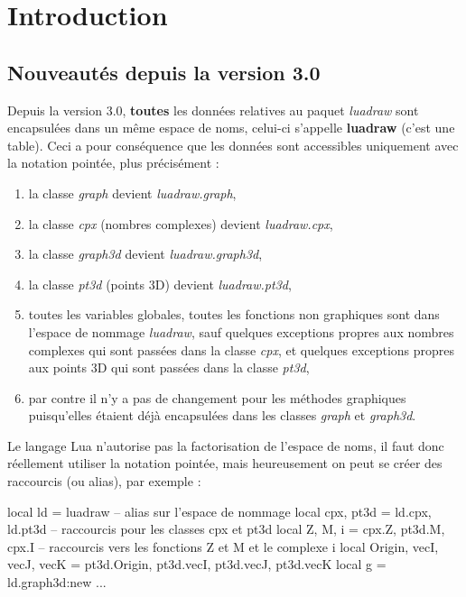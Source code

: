 \section{Introduction}

\subsection{Nouveautés depuis la version 3.0}

Depuis la version 3.0, \textbf{toutes} les données relatives au paquet \emph{luadraw} sont encapsulées dans un même espace de noms, celui-ci s'appelle \textbf{luadraw} (c'est une table). Ceci a pour conséquence que les données sont accessibles uniquement avec la notation pointée, plus précisément :
\begin{enumerate}
    \item la classe \emph{graph} devient \emph{luadraw.graph},
    \item la classe \emph{cpx} (nombres complexes) devient \emph{luadraw.cpx},    
    \item la classe \emph{graph3d} devient \emph{luadraw.graph3d},
    \item la classe \emph{pt3d} (points 3D) devient \emph{luadraw.pt3d},
    \item toutes les variables globales, toutes les fonctions non graphiques sont dans l'espace de nommage \emph{luadraw}, sauf quelques exceptions propres aux nombres complexes qui sont passées dans la classe \emph{cpx}, et quelques exceptions propres aux points 3D qui sont passées dans la classe \emph{pt3d},
    \item par contre il n'y a pas de changement pour les méthodes graphiques puisqu'elles étaient déjà encapsulées dans les classes \emph{graph} et \emph{graph3d}.
\end{enumerate}

Le langage Lua n'autorise pas la factorisation de l'espace de noms, il faut donc réellement utiliser la notation pointée, mais heureusement on peut se créer des raccourcis (ou alias), par exemple :

\begin{Luacode}
local ld = luadraw -- alias sur l'espace de nommage
local cpx, pt3d = ld.cpx, ld.pt3d -- raccourcis pour les classes cpx et pt3d
local Z, M, i = cpx.Z, pt3d.M, cpx.I -- raccourcis vers les fonctions Z et M et le complexe i
local Origin, vecI, vecJ, vecK = pt3d.Origin, pt3d.vecI, pt3d.vecJ, pt3d.vecK
local g = ld.graph3d:new{}
...
\end{Luacode}

